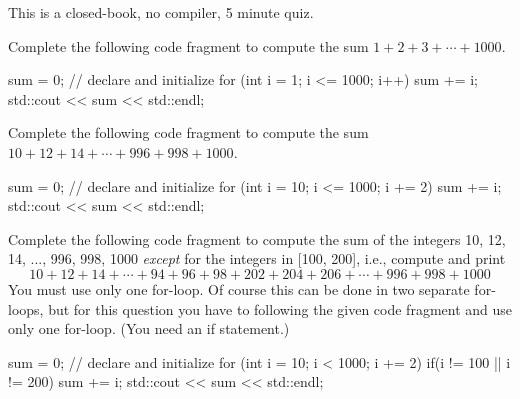 

This is a closed-book, no compiler, 5 minute quiz.

\nextq
Complete the following code fragment to compute
the sum $1 + 2 + 3 + \cdots + 1000$.
\\
\ANSWER
\begin{answercode}
      sum = 0; // declare and initialize
for (int i = 1; i <= 1000; i++)
{
    sum += i; 
}
std::cout << sum << std::endl;
\end{answercode}

\nextq
Complete the following code fragment to compute
the sum $10 + 12 + 14 + \cdots + 996 + 998 + 1000$.
\\
\ANSWER
\begin{answercode}
      sum = 0; // declare and initialize
for (int i = 10; i <= 1000; i += 2)
{
    sum += i;
}
std::cout << sum << std::endl;
\end{answercode}

\nextq
Complete the following code fragment to compute
the sum of the integers 10, 12, 14, ..., 996, 998, 1000
\textit{except} for the integers
in [100, 200], i.e., compute and print
\[
10 + 12 + 14 + \cdots + 94 + 96 + 98 + 202 + 204 + 206 + \cdots + 996 + 998 + 1000
\]
You must use only one for-loop.
Of course this can be done in two separate for-loops, but for this
question you have to following the given code fragment
and use only one for-loop.
(You need an if statement.)
\\
\ANSWER
\begin{answercode}
      sum = 0; // declare and initialize
for (int i = 10; i < 1000; i += 2)
{
    if(i != 100 || i != 200)
    {
        sum += i; 
    }
}
std::cout << sum << std::endl;
\end{answercode}



